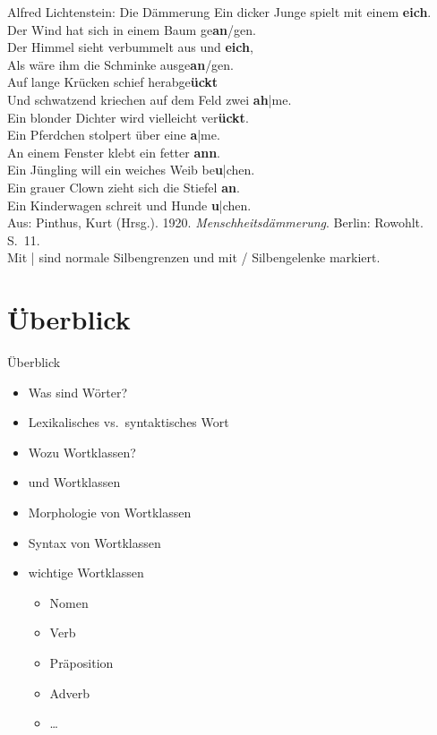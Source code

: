 \begin{frame}
  {Alfred Lichtenstein: Die Dämmerung}
  \pause
  \small
  Ein dicker Junge spielt mit einem \textbf{\alert<3>{eich}}.\\
  Der Wind hat sich in einem Baum ge\textbf{\alert<4>{an}}/gen.\\
  Der Himmel sieht verbummelt aus und \textbf{\alert<3>{eich}},\\
  Als wäre ihm die Schminke ausge\textbf{\alert<4>{an}}/gen.\\
  \Zeile
  Auf lange Krücken schief herabge\textbf{\alert<5>{ückt}}\\
  Und schwatzend kriechen auf dem Feld zwei \textbf{\alert<6>{ah}}|me.\\
  Ein blonder Dichter wird vielleicht ver\textbf{\alert<5>{ückt}}.\\
  Ein Pferdchen stolpert über eine \textbf{\alert<6>{a}}|me.\\
  \Zeile
  An einem Fenster klebt ein fetter \textbf{\alert<7>{ann}}.\\
  Ein Jüngling will ein weiches Weib be\textbf{\alert<8>{u}}|chen.\\
  Ein grauer Clown zieht sich die Stiefel \textbf{\alert<7>{an}}.\\
  Ein Kinderwagen schreit und Hunde \textbf{\alert<8>{u}}|chen.\\
  \Zeile
  \footnotesize
  Aus: Pinthus, Kurt (Hrsg.). 1920. \textit{Menschheitsdämmerung}. Berlin: Rowohlt. S.~11.\\
  Mit | sind normale Silbengrenzen und mit / Silbengelenke markiert.
\end{frame}


\section{Überblick}

\begin{frame}
  {Überblick}
  \pause
  \begin{itemize}[<+->]
    \item Was sind Wörter?
    \item Lexikalisches vs.\ syntaktisches Wort
      \Zeile
    \item Wozu Wortklassen?
    \item {} und Wortklassen
    \item \alert{Morphologie} von Wortklassen
    \item \alert{Syntax} von Wortklassen
      \Zeile
    \item wichtige Wortklassen
      \begin{itemize}[<+->]
        \item Nomen
        \item Verb
        \item Präposition
        \item Adverb
        \item \ldots
      \end{itemize}
  \end{itemize}
\end{frame}

